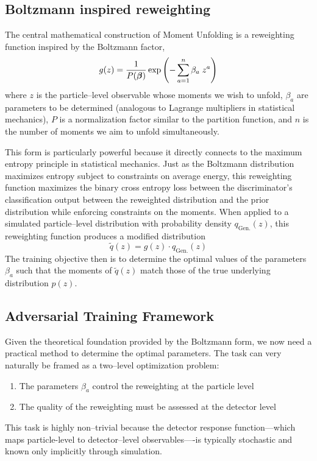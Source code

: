     \subsection{Boltzmann inspired reweighting}
        The central mathematical construction of Moment Unfolding is a reweighting function inspired by the Boltzmann factor,
        \[
            \label{eq:moment-generator}
            g(z) = \frac{1}{P(\vb*{\beta})} \exp\left(-\sum_{a=1}^n \beta_a \; z^a\right)
        \]
        where $z$ is the particle--level observable whose moments we wish to unfold, $\beta_a$ are parameters to be determined (analogous to Lagrange multipliers in statistical mechanics), $P$ is a normalization factor similar to the partition function, and $n$ is the number of moments we aim to unfold simultaneously.

        This form is particularly powerful because it directly connects to the maximum entropy principle in statistical mechanics.
        Just as the Boltzmann distribution maximizes entropy subject to constraints on average energy, this reweighting function maximizes the binary cross entropy loss between the discriminator's classification output between the reweighted distribution and the prior distribution while enforcing constraints on the moments.
        When applied to a simulated particle--level distribution with probability density $q_{\text{Gen.}}(z)$, this reweighting function produces a modified distribution
        \[
            \widetilde{q}(z) = g(z) \cdot q_{\text{Gen.}}(z)
        \]
        The training objective then is to determine the optimal values of the parameters $\beta_a$ such that the moments of $\widetilde{q}(z)$ match those of the true underlying distribution \(p(z)\).
    \subsection{Adversarial Training Framework}
        Given the theoretical foundation provided by the Boltzmann form, we now need a practical method to determine the optimal parameters.
        The task can very naturally be framed as a two--level optimization problem:
        \begin{enumerate}
            \item The parameters $\beta_a$ control the reweighting at the particle level
            \item The quality of the reweighting must be assessed at the detector level
        \end{enumerate}
        This task is highly non--trivial because the detector response function—which maps particle-level to detector--level observables—-is typically stochastic and known only implicitly through simulation.
    
